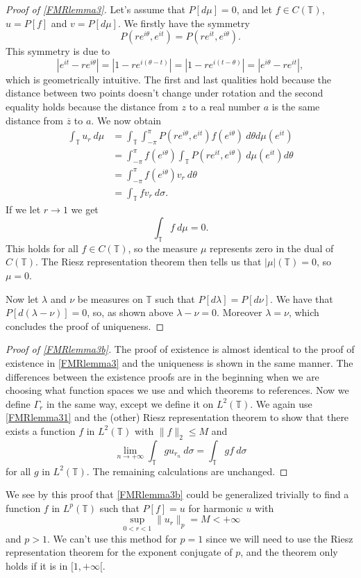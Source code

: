 \documentclass[a4paper,12pt,twoside,BCOR=10mm]{scrbook}
\theoremstyle{definition}
\theoremstyle{definition}
\theoremstyle{definition}
\begin{document}
\begin{proof}[Proof of \ref{FMRlemma3}]
Let's assume that $P[d\mu] = 0$, and let $f \in C(\mathbb{T})$, $u = P[f]$ and $v = P[d\mu]$.
We firstly have the symmetry
\[
	P(re^{i\theta}, e^{it})
	=
	P(re^{it}, e^{i\theta}).
\]
This symmetry is due to
\[
	|e^{it} - re^{i\theta}|
	=
	|1 - re^{i(\theta - t)}|
	=
	|1 - re^{i(t - \theta)}|
	=
	|e^{i\theta} - re^{it}|,
\]
which is geometrically intuitive.
The first and last qualities hold because the distance between two points doesn't change under rotation and the second equality holds because the distance from $z$ to a real number $a$ is the same distance from $\overline{z}$ to $a$.
We now obtain
\begin{align*}
\int_{\mathbb{T}} u_r\ d\mu
&= \int_{\mathbb{T}} \int_{-\pi}^{\pi} P(re^{i\theta}, e^{it}) f(e^{i\theta})\ d\theta d\mu(e^{it})\\
&= \int_{-\pi}^{\pi} f(e^{i\theta}) \int_{\mathbb{T}} P(re^{it}, e^{i\theta})\ d\mu(e^{it}) d\theta\\
&= \int_{-\pi}^{\pi} f(e^{i\theta}) v_r\ d\theta\\
&= \int_{\mathbb{T}} fv_r\ d\sigma.
\end{align*}
If we let $r \rightarrow 1$ we get
\[
	\int_{\mathbb{T}}f\ d\mu = 0.
\]
This holds for all $f \in C(\mathbb{T})$, so the measure $\mu$ represents zero in the dual of $C(\mathbb{T})$.
The Riesz representation theorem then tells us that $|\mu|(\mathbb{T}) = 0$, so $\mu = 0$.

Now let $\lambda$ and $\nu$ be measures on $\mathbb{T}$ such that $P[d\lambda] = P[d\nu]$.
We have that $P[d(\lambda - \nu)] = 0$, so, as shown above $\lambda - \nu = 0$.
Moreover $\lambda = \nu$, which concludes the proof of uniqueness.
\end{proof}
\begin{proof}[Proof of \ref{FMRlemma3b}]
The proof of existence is almost identical to the proof of existence in \ref{FMRlemma3} and the uniqueness is shown in the same manner.
The differences between the existence proofs are in the beginning when we are choosing what function spaces we use and which theorems to references.
Now we define $\Gamma_r$ in the same way, except we define it on $L^2(\mathbb{T})$.
We again use \ref{FMRlemma31} and the (other) Riesz representation theorem to show that there exists a function $f$ in $L^2(\mathbb{T})$ with $\|f\|_2 \leq M$ and
\[
	\lim_{n \rightarrow +\infty} \int_{\mathbb{T}} gu_{r_n}\ d\sigma = \int_{\mathbb{T}}gf\ d\sigma
\]
for all $g$ in $L^2(\mathbb{T})$.
The remaining calculations are unchanged.
\end{proof}
We see by this proof that \ref{FMRlemma3b} could be generalized trivially to find a function $f$ in $L^p(\mathbb{T})$ such that $P[f] = u$ for harmonic $u$ with
\[
	\sup_{0 < r < 1} \|u_r\|_p = M < +\infty
\]
and $p > 1$.
We can't use this method for $p = 1$ since we will need to use the Riesz representation theorem for the exponent conjugate of $p$, and the theorem only holds if it is in $[1, +\infty[$.
\end{document}
